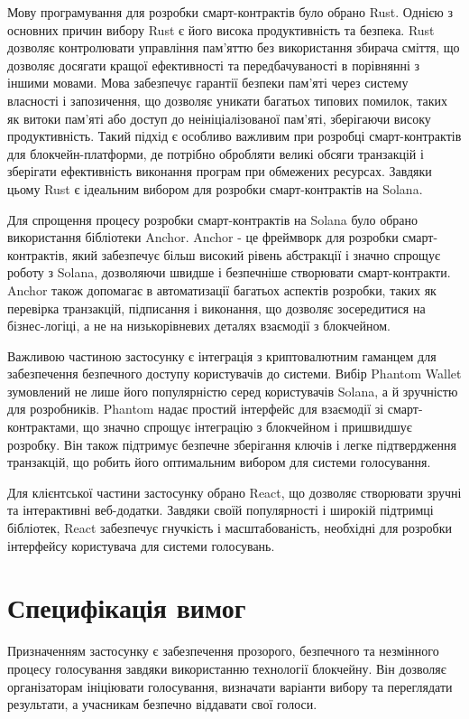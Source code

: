 \documentclass[14pt]{extreport}
\begin{document}
  Мову програмування для розробки смарт-контрактів було обрано Rust. Однією з основних причин вибору Rust є його висока продуктивність та безпека. Rust дозволяє контролювати управління пам'яттю без використання збирача сміття, що дозволяє досягати кращої ефективності та передбачуваності в порівнянні з іншими мовами. Мова забезпечує гарантії безпеки пам'яті через систему власності і запозичення, що дозволяє уникати багатьох типових помилок, таких як витоки пам'яті або доступ до неініціалізованої пам'яті, зберігаючи високу продуктивність. Такий підхід є особливо важливим при розробці смарт-контрактів для блокчейн-платформи, де потрібно обробляти великі обсяги транзакцій і зберігати ефективність виконання програм при обмежених ресурсах. Завдяки цьому Rust є ідеальним вибором для розробки смарт-контрактів на Solana.

  Для спрощення процесу розробки смарт-контрактів на Solana було обрано використання бібліотеки Anchor. Anchor - це фреймворк для розробки смарт-контрактів, який забезпечує більш високий рівень абстракції і значно спрощує роботу з Solana, дозволяючи швидше і безпечніше створювати смарт-контракти. Anchor також допомагає в автоматизації багатьох аспектів розробки, таких як перевірка транзакцій, підписання і виконання, що дозволяє зосередитися на бізнес-логіці, а не на низькорівневих деталях взаємодії з блокчейном.

  Важливою частиною застосунку є інтеграція з криптовалютним гаманцем для забезпечення безпечного доступу користувачів до системи. Вибір Phantom Wallet зумовлений не лише його популярністю серед користувачів Solana, а й зручністю для розробників. Phantom надає простий інтерфейс для взаємодії зі смарт-контрактами, що значно спрощує інтеграцію з блокчейном і пришвидшує розробку. Він також підтримує безпечне зберігання ключів і легке підтвердження транзакцій, що робить його оптимальним вибором для системи голосування.

  Для клієнтської частини застосунку обрано React, що дозволяє створювати зручні та інтерактивні веб-додатки. Завдяки своїй популярності і широкій підтримці бібліотек, React забезпечує гнучкість і масштабованість, необхідні для розробки інтерфейсу користувача для системи голосувань.
  
  \section{Специфікація вимог}
  
  Призначенням застосунку є забезпечення прозорого, безпечного та незмінного процесу голосування завдяки використанню технології блокчейну. Він дозволяє організаторам ініціювати голосування, визначати варіанти вибору та переглядати результати, а учасникам безпечно віддавати свої голоси.
  
\end{document}
